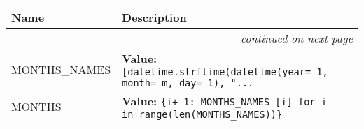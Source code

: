     \vspace{-1cm}
\hspace{\varindent}\begin{longtable}{|p{\varnamewidth}|p{\vardescrwidth}|l}
\cline{1-2}
\cline{1-2} \centering \textbf{Name} & \centering \textbf{Description}& \\
\cline{1-2}
\endhead\cline{1-2}\multicolumn{3}{r}{\small\textit{continued on next page}}\\\endfoot\cline{1-2}
\endlastfoot\raggedright M\-O\-N\-T\-H\-S\-\_\-N\-A\-M\-E\-S\- & \raggedright \textbf{Value:} 
{\tt [datetime.strftime(datetime(year= 1, month= m, day= 1), "\texttt{...}}&\\
\cline{1-2}
\raggedright M\-O\-N\-T\-H\-S\- & \raggedright \textbf{Value:} 
{\tt \{i+ 1: MONTHS\_NAMES [i] for i in range(len(MONTHS\_NAMES))\}}&\\
\cline{1-2}
\end{longtable}

